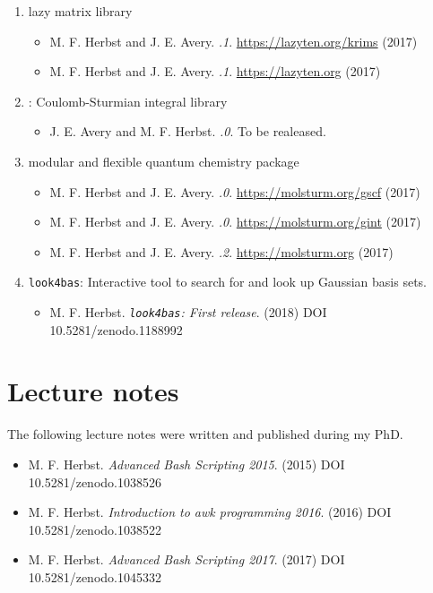 \begin{enumerate}
	\item \lazyten lazy matrix library
		\begin{itemize}
			\item M. F. Herbst and J. E. Avery.
				\textit{.1}. \url{https://lazyten.org/krims} (2017)
			\item M. F. Herbst and J. E. Avery.
				\textit{.1}. \url{https://lazyten.org} (2017)
		\end{itemize}
	\item \sturmint: Coulomb-Sturmian integral library
		\begin{itemize}
			\item J. E. Avery and M. F. Herbst.
				\textit{.0}. To be realeased.
		\end{itemize}
	\item \molsturm modular and flexible quantum chemistry package
		\begin{itemize}
			\item M. F. Herbst and J. E. Avery.
				\textit{.0}. \url{https://molsturm.org/gscf} (2017)
			\item M. F. Herbst and J. E. Avery.
				\textit{.0}. \url{https://molsturm.org/gint} (2017)
			\item M. F. Herbst and J. E. Avery.
				\textit{.2}. \url{https://molsturm.org} (2017)
		\end{itemize}
	\item \texttt{look4bas}: Interactive tool to search for and
			look up Gaussian basis sets.
		\begin{itemize}
			\item M. F. Herbst. \textit{\texttt{look4bas}: First release}. (2018) DOI \mbox{10.5281/zenodo.1188992}
		\end{itemize}
\end{enumerate}

\section*{Lecture notes}
The following lecture notes were written and published during my PhD.
\begin{itemize}
	\item M. F. Herbst. \textit{Advanced Bash Scripting 2015}. (2015) DOI \mbox{10.5281/zenodo.1038526}
	\item M. F. Herbst. \textit{Introduction to awk programming 2016}. (2016) DOI \mbox{10.5281/zenodo.1038522}
	\item M. F. Herbst. \textit{Advanced Bash Scripting 2017}. (2017) DOI \mbox{10.5281/zenodo.1045332}
\end{itemize}

